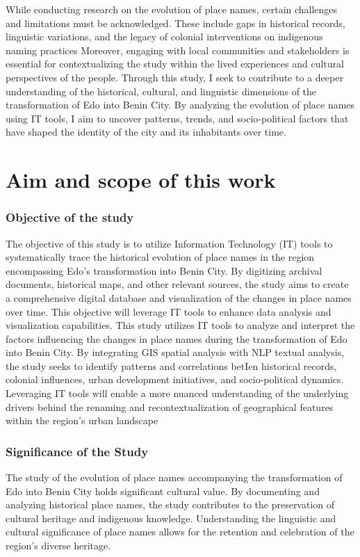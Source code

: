 While conducting research on the evolution of place names, certain challenges and limitations must be acknowledged. These include gaps in historical records, linguistic variations, and the legacy of colonial interventions on indigenous naming practices Moreover, engaging with local communities and stakeholders is essential for contextualizing the study within the lived experiences and cultural perspectives of the people.
Through this study, I seek to contribute to a deeper understanding of the historical, cultural, and linguistic dimensions of the transformation of Edo into Benin City. By analyzing the evolution of place names using IT tools, I aim to uncover patterns, trends, and socio-political factors that have shaped the identity of the city and its inhabitants over time.

\section{Aim and scope of this work}
\subsubsection{Objective of the study}
The objective of this study is to utilize Information Technology (IT) tools to systematically trace the historical evolution of place names in the region encompassing Edo's transformation into Benin City. By digitizing archival documents, historical maps, and other relevant sources, the study aims to create a comprehensive digital database and visualization of the changes in place names over time. This objective will leverage IT tools to enhance data analysis and visualization capabilities.
This study utilizes IT tools to analyze and interpret the factors influencing the changes in place names during the transformation of Edo into Benin City. By integrating GIS spatial analysis with NLP textual analysis, the study seeks to identify patterns and correlations betIen historical records, colonial influences, urban development initiatives, and socio-political dynamics. Leveraging IT tools will enable a more nuanced understanding of the underlying drivers behind the renaming and recontextualization of geographical features within the region's urban landscape
\subsubsection{Significance of the Study}
The study of the evolution of place names accompanying the transformation of Edo into Benin City holds significant cultural value. By documenting and analyzing historical place names, the study contributes to the preservation of cultural heritage and indigenous knowledge. Understanding the linguistic and cultural significance of place names allows for the retention and celebration of the region's diverse heritage. 

